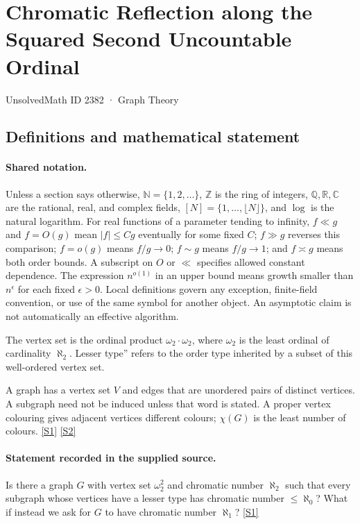 \documentclass[11pt,a4paper]{article}
\newcommand{\N}{\mathbb{N}}
\newcommand{\Z}{\mathbb{Z}}
\newcommand{\Q}{\mathbb{Q}}
\newcommand{\R}{\mathbb{R}}
\newcommand{\C}{\mathbb{C}}
\newcommand{\sref}[2]{\hyperlink{source:#1:#2}{[S#2]}}
\begin{document}

\setcounter{section}{2381}

\section{Chromatic Reflection along the Squared Second Uncountable Ordinal}\label{2382}

{\small\sffamily UnsolvedMath ID 2382 · Graph Theory}

\subsection{Definitions and mathematical statement}

\paragraph{Shared notation.}Unless a section says otherwise, $\N=\{1,2,\ldots\}$,
$\Z$ is the ring of integers, $\Q,\R,\C$ are the rational, real, and complex
fields, $[N]=\{1,\ldots,\lfloor N\rfloor\}$, and $\log$ is the natural
logarithm. For real functions of a parameter tending to infinity,
$f\ll g$ and $f=O(g)$ mean $|f|\leq Cg$ eventually for some fixed $C$;
$f\gg g$ reverses this comparison; $f=o(g)$ means $f/g\to0$;
$f\sim g$ means $f/g\to1$; and $f\asymp g$ means both order bounds.
A subscript on $O$ or $\ll$ specifies allowed constant dependence.
The expression $n^{o(1)}$ in an upper bound means growth smaller than
$n^\epsilon$ for each fixed $\epsilon>0$. Local definitions govern any
exception, finite-field convention, or use of the same symbol for another
object. An asymptotic claim is not automatically an effective algorithm.



The vertex set is the ordinal product $\omega_2\cdot\omega_2$, where $\omega_2$ is the least ordinal of cardinality $\aleph_2$. Lesser type'' refers to the order type inherited by a subset of this well-ordered vertex set.

A graph has a vertex set $V$ and edges that are unordered pairs of distinct vertices. A subgraph need not be induced unless that word is stated. A proper vertex colouring gives adjacent vertices different colours; $\chi(G)$ is the least number of colours. \sref{2382}{1} \sref{2382}{2}

\paragraph{Statement recorded in the supplied source.}
Is there a graph $G$ with vertex set $\omega_2^2$ and chromatic number $\aleph_2$ such that every subgraph whose vertices have a lesser type has chromatic number $\leq \aleph_0$?
What if instead we ask for $G$ to have chromatic number $\aleph_1$? \sref{2382}{1}
\end{document}
